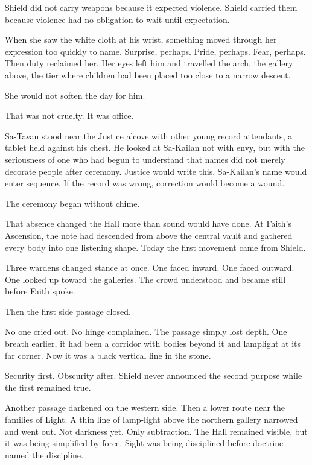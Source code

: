 Shield did not carry weapons because it expected violence.
Shield carried them because violence had no obligation to wait until expectation.\par
When she saw the white cloth at his wrist, something moved through her expression too quickly to name.
Surprise, perhaps.
Pride, perhaps.
Fear, perhaps.
Then duty reclaimed her.
Her eyes left him and travelled the arch, the gallery above, the tier where children had been placed too close to a narrow descent.\par
She would not soften the day for him.\par
That was not cruelty.
It was office.\par
Sa-Tavan stood near the Justice alcove with other young record attendants, a tablet held against his chest.
He looked at Sa-Kailan not with envy, but with the seriousness of one who had begun to understand that names did not merely decorate people after ceremony.
Justice would write this.
Sa-Kailan’s name would enter sequence.
If the record was wrong, correction would become a wound.\par
The ceremony began without chime.\par
That absence changed the Hall more than sound would have done.
At Faith’s Ascension, the note had descended from above the central vault and gathered every body into one listening shape.
Today the first movement came from Shield.\par
Three wardens changed stance at once.
One faced inward.
One faced outward.
One looked up toward the galleries.
The crowd understood and became still before Faith spoke.\par
Then the first side passage closed.\par
No one cried out.
No hinge complained.
The passage simply lost depth.
One breath earlier, it had been a corridor with bodies beyond it and lamplight at its far corner.
Now it was a black vertical line in the stone.\par
Security first.
Obscurity after.
Shield never announced the second purpose while the first remained true.\par
Another passage darkened on the western side.
Then a lower route near the families of Light.
A thin line of lamp-light above the northern gallery narrowed and went out.
Not darkness yet.
Only subtraction.
The Hall remained visible, but it was being simplified by force.
Sight was being disciplined before doctrine named the discipline.\par
